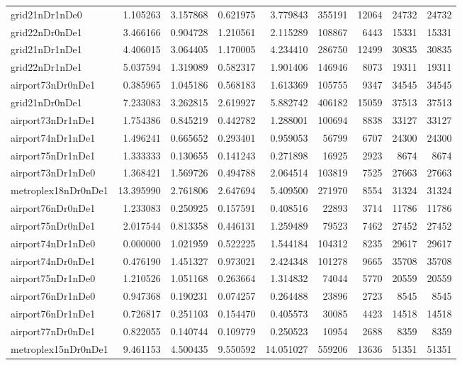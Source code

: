 \begin{longtable}{|l|r|r|r|r|r|r|r|r|}
grid21nDr1nDe0 & 1.105263 & 3.157868 & 0.621975 & 3.779843 & 355191 & 12064 & 24732 & 24732 \\
grid22nDr0nDe1 & 3.466166 & 0.904728 & 1.210561 & 2.115289 & 108867 & 6443 & 15331 & 15331 \\
grid21nDr1nDe1 & 4.406015 & 3.064405 & 1.170005 & 4.234410 & 286750 & 12499 & 30835 & 30835 \\
grid22nDr1nDe1 & 5.037594 & 1.319089 & 0.582317 & 1.901406 & 146946 & 8073 & 19311 & 19311 \\
airport73nDr0nDe1 & 0.385965 & 1.045186 & 0.568183 & 1.613369 & 105755 & 9347 & 34545 & 34545 \\
grid21nDr0nDe1 & 7.233083 & 3.262815 & 2.619927 & 5.882742 & 406182 & 15059 & 37513 & 37513 \\
airport73nDr1nDe1 & 1.754386 & 0.845219 & 0.442782 & 1.288001 & 100694 & 8838 & 33127 & 33127 \\
airport74nDr1nDe1 & 1.496241 & 0.665652 & 0.293401 & 0.959053 & 56799 & 6707 & 24300 & 24300 \\
airport75nDr1nDe1 & 1.333333 & 0.130655 & 0.141243 & 0.271898 & 16925 & 2923 & 8674 & 8674 \\
airport73nDr1nDe0 & 1.368421 & 1.569726 & 0.494788 & 2.064514 & 103819 & 7525 & 27663 & 27663 \\
metroplex18nDr0nDe1 & 13.395990 & 2.761806 & 2.647694 & 5.409500 & 271970 & 8554 & 31324 & 31324 \\
airport76nDr0nDe1 & 1.233083 & 0.250925 & 0.157591 & 0.408516 & 22893 & 3714 & 11786 & 11786 \\
airport75nDr0nDe1 & 2.017544 & 0.813358 & 0.446131 & 1.259489 & 79523 & 7462 & 27452 & 27452 \\
airport74nDr1nDe0 & 0.000000 & 1.021959 & 0.522225 & 1.544184 & 104312 & 8235 & 29617 & 29617 \\
airport74nDr0nDe1 & 0.476190 & 1.451327 & 0.973021 & 2.424348 & 101278 & 9665 & 35708 & 35708 \\
airport75nDr1nDe0 & 1.210526 & 1.051168 & 0.263664 & 1.314832 & 74044 & 5770 & 20559 & 20559 \\
airport76nDr1nDe0 & 0.947368 & 0.190231 & 0.074257 & 0.264488 & 23896 & 2723 & 8545 & 8545 \\
airport76nDr1nDe1 & 0.726817 & 0.251103 & 0.154470 & 0.405573 & 30085 & 4423 & 14518 & 14518 \\
airport77nDr0nDe1 & 0.822055 & 0.140744 & 0.109779 & 0.250523 & 10954 & 2688 & 8359 & 8359 \\
metroplex15nDr0nDe1 & 9.461153 & 4.500435 & 9.550592 & 14.051027 & 559206 & 13636 & 51351 & 51351 \\

\end{longtable}
